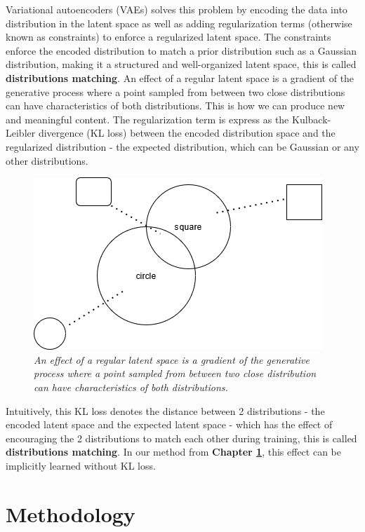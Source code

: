 \documentclass[12pt]{report}
\begin{document}
Variational autoencoders (VAEs) solves this problem by encoding the data into distribution in the latent space as well as adding regularization terms (otherwise known as constraints) to enforce a regularized latent space. The constraints enforce the encoded distribution to match a prior distribution such as a Gaussian distribution, making it a structured and well-organized latent space, this is called \textbf{distributions matching}. An effect of a regular latent space is a gradient of the generative process where a point sampled from between two close distributions can have characteristics of both distributions. This is how we can produce new and meaningful content. The regularization term is express as the Kulback-Leibler divergence (KL loss) \cite{kl-divergence} between the encoded distribution space and the regularized distribution - the expected distribution, which can be Gaussian or any other distributions.

\begin{figure}[h]
	\centering
	\includegraphics[scale=0.9]{distribution-space}
	\caption{\textit{An effect of a regular latent space is a gradient of the generative process where a point sampled from between two close distribution can have characteristics of both distributions.}}
	\label{fig:distribution-space}
\end{figure}

Intuitively, this KL loss denotes the distance between 2 distributions - the encoded latent space and the expected latent space - which has the effect of encouraging the 2 distributions to match each other during training, this is called \textbf{distributions matching}. In our method from \textbf{Chapter \ref{chap:methodology}}, this effect can be implicitly learned without KL loss.

\chapter{Methodology}
\label{chap:methodology}
\end{document}
